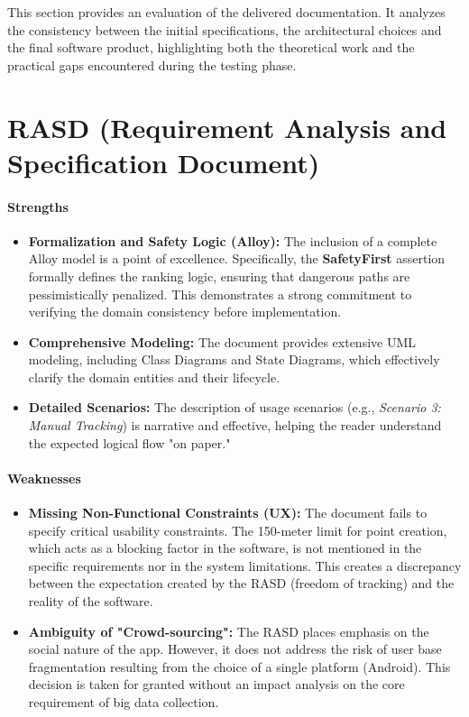 This section provides an evaluation of the delivered documentation. It analyzes the consistency between the initial specifications, the architectural choices and the final software product, highlighting both the theoretical work and the practical gaps encountered during the testing phase.

\section{RASD (Requirement Analysis and Specification Document)}
\paragraph{Strengths}
\begin{itemize}
    \item \textbf{Formalization and Safety Logic (Alloy):} The inclusion of a complete Alloy model is a point of excellence. Specifically, the \textbf{SafetyFirst} assertion formally defines the ranking logic, ensuring that dangerous paths are pessimistically penalized. This demonstrates a strong commitment to verifying the domain consistency before implementation.
    \item \textbf{Comprehensive Modeling:} The document provides extensive UML modeling, including Class Diagrams and State Diagrams, which effectively clarify the domain entities and their lifecycle.
    \item \textbf{Detailed Scenarios:} The description of usage scenarios (e.g., \textit{Scenario 3: Manual Tracking}) is narrative and effective, helping the reader understand the expected logical flow "on paper."
\end{itemize}

\paragraph{Weaknesses}
\begin{itemize}
    \item \textbf{Missing Non-Functional Constraints (UX):} The document fails to specify critical usability constraints. The 150-meter limit for point creation, which acts as a blocking factor in the software, is not mentioned in the specific requirements nor in the system limitations. This creates a discrepancy between the expectation created by the RASD (freedom of tracking) and the reality of the software.
    \item \textbf{Ambiguity of "Crowd-sourcing":} The RASD places emphasis on the social nature of the app. However, it does not address the risk of user base fragmentation resulting from the choice of a single platform (Android). This decision is taken for granted without an impact analysis on the core requirement of big data collection.
\end{itemize}

